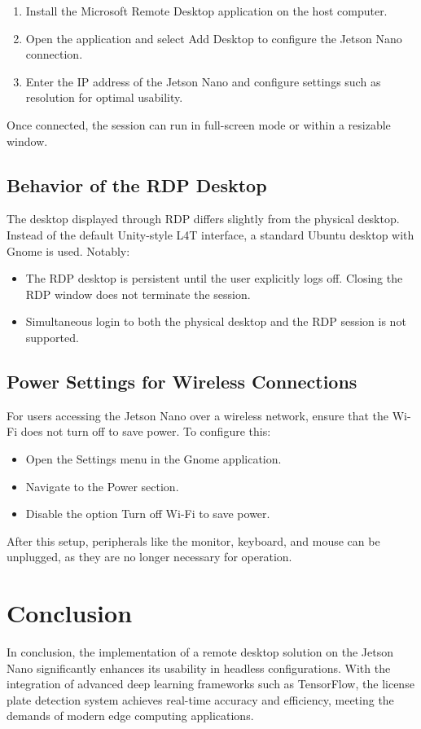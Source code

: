 \begin{enumerate}
	\item Install the Microsoft Remote Desktop application on the host computer.
	\item Open the application and select \glqq Add Desktop\grqq{} to configure the Jetson Nano connection.
	\item Enter the IP address of the Jetson Nano and configure settings such as resolution for optimal usability.
\end{enumerate}

Once connected, the session can run in full-screen mode or within a resizable window.

\subsection{Behavior of the RDP Desktop}

The desktop displayed through RDP differs slightly from the physical desktop. Instead of the default Unity-style L4T interface, a standard Ubuntu desktop with Gnome is used. Notably:

\begin{itemize}
	\item The RDP desktop is persistent until the user explicitly logs off. Closing the RDP window does not terminate the session.
	\item Simultaneous login to both the physical desktop and the RDP session is not supported.
\end{itemize}

\subsection{Power Settings for Wireless Connections}

For users accessing the Jetson Nano over a wireless network, ensure that the Wi-Fi does not turn off to save power. To configure this:

\begin{itemize}
	\item Open the \glqq Settings\grqq{} menu in the Gnome application.
	\item Navigate to the \glqq Power\grqq{} section.
	\item Disable the option \glqq Turn off Wi-Fi to save power\grqq{}.
\end{itemize}

After this setup, peripherals like the monitor, keyboard, and mouse can be unplugged, as they are no longer necessary for operation.

\section{Conclusion}

In conclusion, the implementation of a remote desktop solution on the Jetson Nano significantly enhances its usability in headless configurations. With the integration of advanced deep learning frameworks such as TensorFlow, the license plate detection system achieves real-time accuracy and efficiency, meeting the demands of modern edge computing applications.
